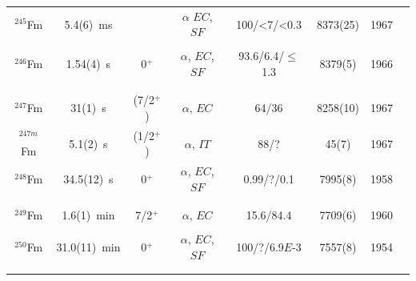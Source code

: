 \begin{center}
\begin{longtable}{c|ccccccl}
$^{245}$Fm	& 5.4(6)~ms		&  			&$\alpha$	 $EC$, $SF$	&100/<7/<0.3& 8373(25)		&1967	&{\tiny\cite{Nurmia1967,Holden2000,Haba2007,Rezynkina2015,Khuyagbaatar2020a,Svirikhin2021}}\\
			& 				&  			&					&			& 				    &		&{\tiny\cite{Khuyagbaatar2021,Lopez-Martens2022,Tezekbayeva2022}}\\
$^{246}$Fm	& 1.54(4)~s		&  0$^+$	&$\alpha$, $EC$, $SF$&93.6/6.4/$\leq$1.3& 8379(5)	&1966	&{\tiny\cite{Akapev1966,Flerov1967,Nurmia1967,Oganessian1975,Bogdanov1982,Ninov1996}}\\
			& 				&  			&					&			& 				    &		&{\tiny\cite{Sagaidak1998,Antalic2010,Svirikhin2010,Venhart2011,Piot2012,Rezynkina2015}}\\
			& 				&  			&					&			& 				    &		&{\tiny\cite{Khuyagbaatar2022,Tezekbayeva2022,Warbinek2024}}\\
$^{247}$Fm	& 31(1)~s		& (7/2$^+$)	&$\alpha$, $EC$		&64/36		& 8258(10)		    &1967	&{\tiny\cite{Flerov1967,Hessberger1989,Hessberger2004,Hessberger2006,Folden2009,Dragojevic2009}}\\
$^{247m}$Fm	& 5.1(2)~s		& (1/2$^+$)	&$\alpha$, $IT$		&88/?		&   45(7)			&1967	&{\tiny\cite{Flerov1967,Hessberger2004,Hessberger2006,Folden2009}}\\ 
$^{248}$Fm	& 34.5(12)~s	&  0$^+$	&$\alpha$, $EC$, $SF$&0.99/?/0.1& 7995(8)			&1958	&{\tiny\cite{Ghiorso1958,Akapev1966,Nurmia1967,Eskola1973,Andreyev1993,Holden2000}}\\
			& 				&  			&					&			& 				    &		&{\tiny\cite{Greenlees2005,Nishio2006,Leppanen2006,Ketelhut2010,Gates2011,Sulignano2012}}\\
			& 				&  			&					&			& 				    &		&{\tiny\cite{Pore2024, Warbinek2024}}\\
$^{249}$Fm	& 1.6(1)~min	&  7/2$^+$	&$\alpha$, $EC$		&15.6/84.4	& 7709(6)			&1960	&{\tiny\cite{Perelygin1960,Akapev1966,Andreyev1993,Hessberger2004,Lopez-Martens2006,Lopez-Martens2007}}\\
			& 				&  			&					&			& 				    &		&{\tiny\cite{Hessberger2009,Qian2009,Hessberger2012,Rissanen2013,Ackermann2018,Warbinek2024}}\\
$^{250}$Fm	& 31.0(11)~min	&  0$^+$	&$\alpha$, $EC$, $SF$&100/?/6.9$E$-3& 7557(8)		&1954	&{\tiny\cite{Atterling1954,Amiel1957,Akapev1966,Ghiorso1969,Ghiorso1971,Chasteler1987}}\\
			& 				&  			&					&			& 				    &		&{\tiny\cite{Lazarev1989,Leino1999,Nishio2004,Greenlees2005,Folden2006,Bastin2006}}\\
			& 				&  			&					&			& 				    &		&{\tiny\cite{Robinson2008,Greenlees2008,Gates2008,Nelson2009,Hessberger2010,Sulignano2012}}\\

\end{longtable}
\end{center}
